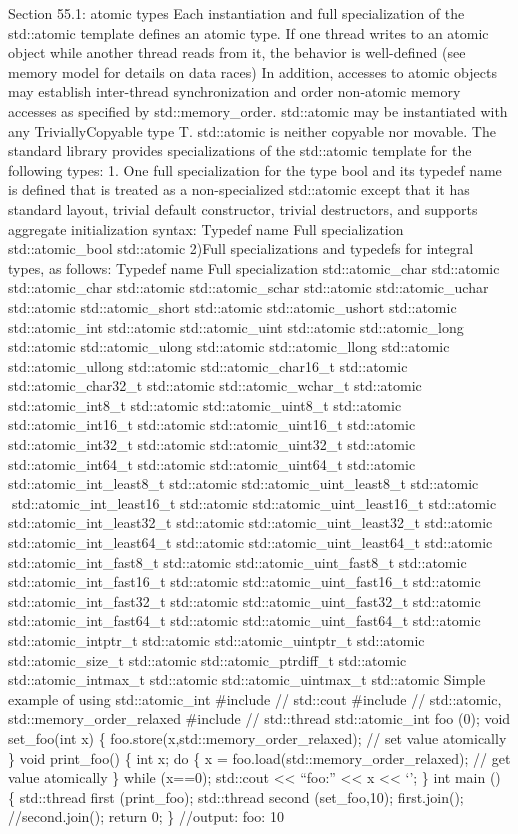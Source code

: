 Section 55.1: atomic types Each instantiation and full specialization of
the std::atomic template deﬁnes an atomic type. If one thread writes to
an atomic object while another thread reads from it, the behavior is
well-deﬁned (see memory model for details on data races) In addition,
accesses to atomic objects may establish inter-thread synchronization
and order non-atomic memory accesses as speciﬁed by std::memory\_order.
std::atomic may be instantiated with any TriviallyCopyable type T.
std::atomic is neither copyable nor movable. The standard library
provides specializations of the std::atomic template for the following
types: 1. One full specialization for the type bool and its typedef name
is deﬁned that is treated as a non-specialized std::atomic except that
it has standard layout, trivial default constructor, trivial
destructors, and supports aggregate initialization syntax: Typedef name
Full specialization std::atomic\_bool std::atomic 2)Full specializations
and typedefs for integral types, as follows: Typedef name Full
specialization std::atomic\_char std::atomic std::atomic\_char
std::atomic std::atomic\_schar std::atomic std::atomic\_uchar
std::atomic std::atomic\_short std::atomic std::atomic\_ushort
std::atomic std::atomic\_int std::atomic std::atomic\_uint std::atomic
std::atomic\_long std::atomic std::atomic\_ulong std::atomic
std::atomic\_llong std::atomic std::atomic\_ullong std::atomic
std::atomic\_char16\_t std::atomic std::atomic\_char32\_t std::atomic
std::atomic\_wchar\_t std::atomic std::atomic\_int8\_t std::atomic
std::atomic\_uint8\_t std::atomic std::atomic\_int16\_t std::atomic
std::atomic\_uint16\_t std::atomic std::atomic\_int32\_t std::atomic
std::atomic\_uint32\_t std::atomic std::atomic\_int64\_t std::atomic
std::atomic\_uint64\_t std::atomic std::atomic\_int\_least8\_t
std::atomic std::atomic\_uint\_least8\_t std::atomic
std::atomic\_int\_least16\_t std::atomic std::atomic\_uint\_least16\_t
std::atomic std::atomic\_int\_least32\_t std::atomic
std::atomic\_uint\_least32\_t std::atomic std::atomic\_int\_least64\_t
std::atomic std::atomic\_uint\_least64\_t std::atomic
std::atomic\_int\_fast8\_t std::atomic std::atomic\_uint\_fast8\_t
std::atomic std::atomic\_int\_fast16\_t std::atomic
std::atomic\_uint\_fast16\_t std::atomic std::atomic\_int\_fast32\_t
std::atomic std::atomic\_uint\_fast32\_t std::atomic
std::atomic\_int\_fast64\_t std::atomic std::atomic\_uint\_fast64\_t
std::atomic std::atomic\_intptr\_t std::atomic std::atomic\_uintptr\_t
std::atomic std::atomic\_size\_t std::atomic std::atomic\_ptrdiff\_t
std::atomic std::atomic\_intmax\_t std::atomic std::atomic\_uintmax\_t
std::atomic Simple example of using std::atomic\_int \#include //
std::cout \#include // std::atomic, std::memory\_order\_relaxed
\#include // std::thread std::atomic\_int foo (0); void set\_foo(int x)
\{ foo.store(x,std::memory\_order\_relaxed); // set value atomically \}
void print\_foo() \{ int x; do \{ x =
foo.load(std::memory\_order\_relaxed); // get value atomically \} while
(x==0); std::cout \textless\textless{} ``foo:'' \textless\textless{} x
\textless\textless{} `\n'; \} int main () \{ std::thread first
(print\_foo); std::thread second (set\_foo,10); first.join();
//second.join(); return 0; \} //output: foo: 10

